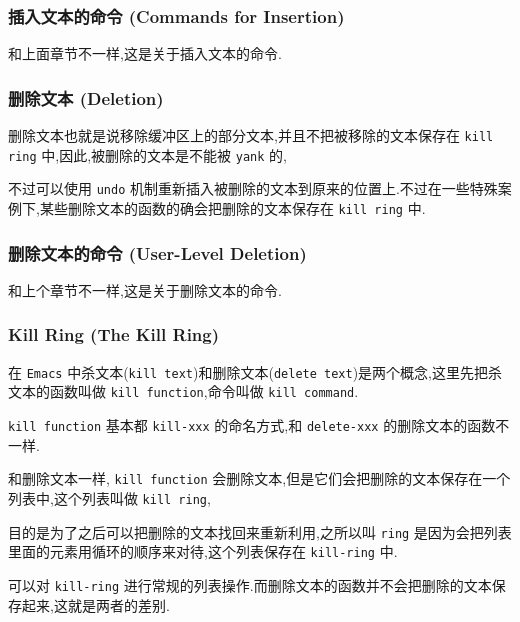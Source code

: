 \documentclass[11pt]{article}
\begin{document}
\subsubsection{插入文本的命令 (Commands for Insertion)}
\label{sec:org50788b4}

和上面章节不一样,这是关于插入文本的命令.


\subsubsection{删除文本 (Deletion)}
\label{sec:org2819101}

删除文本也就是说移除缓冲区上的部分文本,并且不把被移除的文本保存在 \texttt{kill ring} 中,因此,被删除的文本是不能被 \texttt{yank} 的,

不过可以使用 \texttt{undo} 机制重新插入被删除的文本到原来的位置上.不过在一些特殊案例下,某些删除文本的函数的确会把删除的文本保存在 \texttt{kill ring} 中.


\subsubsection{删除文本的命令 (User-Level Deletion)}
\label{sec:orgcd7cbad}

和上个章节不一样,这是关于删除文本的命令.


\subsubsection{Kill Ring (The Kill Ring)}
\label{sec:org18ad353}

在 \texttt{Emacs} 中杀文本(\texttt{kill text})和删除文本(\texttt{delete text})是两个概念,这里先把杀文本的函数叫做 \texttt{kill function},命令叫做 \texttt{kill command}.

\texttt{kill function} 基本都 \texttt{kill-xxx} 的命名方式,和 \texttt{delete-xxx} 的删除文本的函数不一样.

和删除文本一样, \texttt{kill function} 会删除文本,但是它们会把删除的文本保存在一个列表中,这个列表叫做 \texttt{kill ring},

目的是为了之后可以把删除的文本找回来重新利用,之所以叫 \texttt{ring} 是因为会把列表里面的元素用循环的顺序来对待,这个列表保存在 \texttt{kill-ring} 中.

可以对 \texttt{kill-ring} 进行常规的列表操作.而删除文本的函数并不会把删除的文本保存起来,这就是两者的差别.
\end{document}
